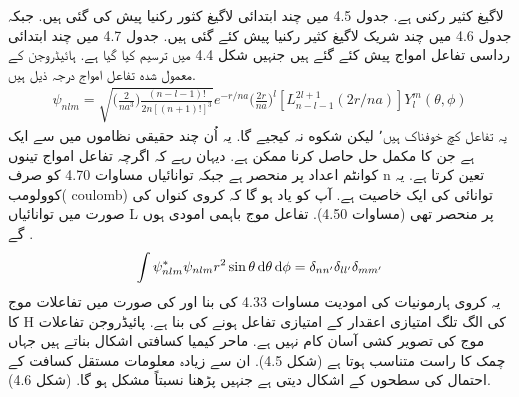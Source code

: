  لاگیغ كثير رکنی ہے. جدول 4.5 میں چند ابتدائی لاگيغ كثور رکنیا پیش کی گئی ہیں.  جبکہ جدول 4.6 میں چند شریک لاگيغ كثير رکنیا پیش کئے گئی ہیں. جدول 4.7 میں چند ابتدائی رداسی تفاعل امواج پیش کئے گئے ہیں جنہیں شکل 4.4 میں ترسیم کیا گیا ہے. ہائیڈروجن کے معمول شده تفاعل امواج درجہ ذیل ہیں.
  \begin{align}
\boxed{\psi_{nlm}=\sqrt{\big(\frac{2}{na^{3}}\big)\frac{(n-l-1)!}{2n[(n+1)!]^{3}}}e^{-r/na}\big(\frac{2r}{na}\big)^{l}[L_{n-l-1}^{2l+1}(2r/na)]Y_{l}^{m}(\theta,\phi)} 
\end{align}
یہ تفاعل کچ خوفناک ہیں٬ ليكن شكوه نہ کیجیے گا. یہ اُن چند حقیقی نظاموں میں سے ایک ہے جن کا مکمل حل حاصل کرنا ممکن ہے.  دیہان رہے کہ اگرچہ تفاعل امواج تینوں کوانٹم اعداد پر منحصر ہے جبکہ توانائیاں مساوات 4.70 کو صرف n تعین کرتا ہے. یہ کوولومب( coulomb) توانائی کی ایک خاصیت ہے. آپ کو یاد ہو گا کہ کروی كنواں کی صورت میں توانائیاں L پر منحصر تھی (مساوات 4.50).
تفاعل موج باہمی امودی ہوں گے 
.\begin{align}
\int\psi_{nlm}^{*}\psi_{nlm}r^{2}\sin{\theta}\dif{\theta}\dif{\phi}=\delta_{nn'}\delta_{ll'}\delta_{mm'} 
\end{align}
 یہ کروی ہارمونیات کی امودیت مساوات 4.33 کی بنا اور
کی صورت میں تفاعلات موج کا H کی الگ تلگ امتیازی اعقدار کے امتیازی تفاعل ہونے کی بنا ہے.
پائیڈروجن تفاعلات موج کی تصویر کشی آسان کام نہیں ہے. ماحر کیمیا کسافتی اشکال بناتے ہیں جہاں چمک
کا راست متناسب ہوتا ہے (شکل 4.5). ان سے زیادہ معلومات مستقل كسافت کے احتمال کی سطحوں کے اشکال دیتی ہے جنہیں پڑھنا نسبتاً مشکل ہو گا. (شکل 4.6).\\

